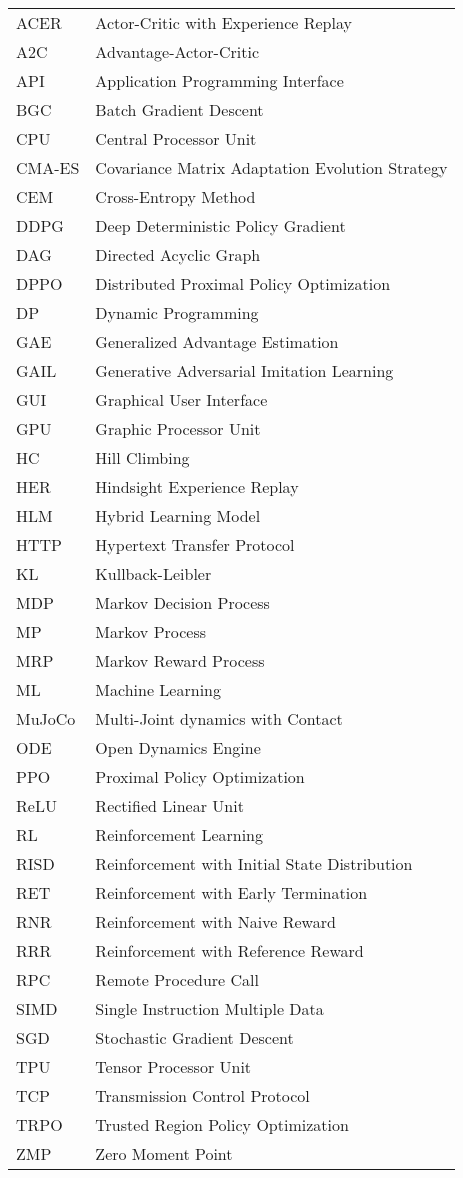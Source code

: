 \begin{longtable}{ll}
ACER & Actor-Critic with Experience Replay \\
A2C & Advantage-Actor-Critic \\
API & Application Programming Interface \\
BGC & Batch Gradient Descent \\
CPU & Central Processor Unit \\
CMA-ES & Covariance Matrix Adaptation Evolution Strategy \\
CEM & Cross-Entropy Method \\
DDPG & Deep Deterministic Policy Gradient \\
DAG & Directed Acyclic Graph \\
DPPO & Distributed Proximal Policy Optimization \\
DP & Dynamic Programming \\
GAE & Generalized Advantage Estimation \\
GAIL & Generative Adversarial Imitation Learning \\
GUI & Graphical User Interface \\
GPU & Graphic Processor Unit \\
HC & Hill Climbing \\
HER & Hindsight Experience Replay \\
HLM & Hybrid Learning Model \\
HTTP & Hypertext Transfer Protocol \\
KL & Kullback-Leibler \\
MDP & Markov Decision Process \\
MP & Markov Process \\
MRP & Markov Reward Process \\
ML & Machine Learning \\
MuJoCo & Multi-Joint dynamics with Contact \\
ODE & Open Dynamics Engine \\
PPO & Proximal Policy Optimization \\
ReLU & Rectified Linear Unit \\
RL & Reinforcement Learning \\
RISD & Reinforcement with Initial State Distribution \\
RET & Reinforcement with Early Termination \\
RNR & Reinforcement with Naive Reward \\
RRR & Reinforcement with Reference Reward \\
RPC & Remote Procedure Call \\
SIMD & Single Instruction Multiple Data \\
SGD & Stochastic Gradient Descent \\
TPU & Tensor Processor Unit \\
TCP & Transmission Control Protocol \\
TRPO & Trusted Region Policy Optimization \\
ZMP & Zero Moment Point \\

\end{longtable}

